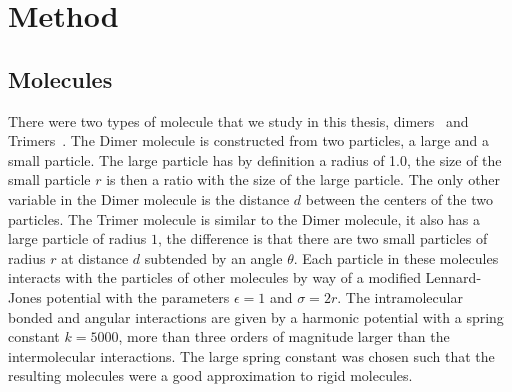 
\chapter{Method}

\section{Molecules}

There were two types of molecule that we study in this thesis, dimers~ and Trimers~. The Dimer molecule is constructed from two particles, a large and a small particle. The large particle has by definition a radius of \num{1.0}, the size of the small particle $r$ is then a ratio with the size of the large particle. The only other variable in the Dimer molecule is the distance $d$ between the centers of the two particles. The Trimer molecule is similar to the Dimer molecule, it also has a large particle of radius $1$, the difference is that there are two small particles of radius $r$ at distance $d$ subtended by an angle $\theta$. Each particle in these molecules interacts with the particles of other molecules by way of a modified Lennard-Jones potential with the parameters $\epsilon = 1$ and $\sigma = 2r$. The intramolecular bonded and angular interactions are given by a harmonic potential with a spring constant $k=5000$, more than three orders of magnitude larger than the intermolecular interactions. The large spring constant was chosen such that the resulting molecules were a good approximation to rigid molecules.

